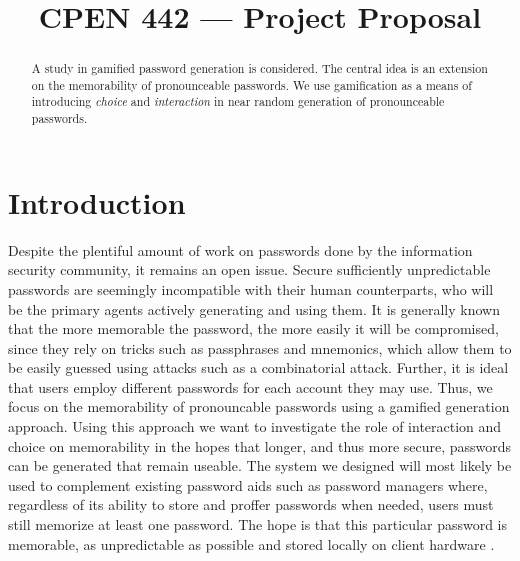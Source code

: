 \documentclass[conference]{IEEEtran}
\begin{document}
\title{CPEN 442 --- Project Proposal}


\author{
\and
{}
}


\maketitle

\begin{abstract}
A study in gamified password generation is considered. The central idea is an extension on the memorability of pronounceable passwords. We use gamification as a means of introducing \emph{choice} and \emph{interaction} in near random generation of pronounceable passwords.
\end{abstract}

\section{Introduction}
Despite the plentiful amount of work on passwords done by the information security community, it remains an open issue. Secure sufficiently unpredictable passwords are seemingly incompatible with their human counterparts, who will be the primary agents actively generating and using them. It is generally known that the more memorable the password, the more easily it will be compromised, since they rely on tricks such as passphrases and mnemonics, which allow them to be easily guessed using attacks such as a combinatorial attack. Further, it is ideal that users employ different passwords for each account they may use. Thus, we focus on the memorability of pronouncable passwords using a gamified generation approach. Using this approach we want to investigate the role of interaction and choice on memorability in the hopes that longer, and thus more secure, passwords can be generated that remain useable. The system we designed will most likely be used to complement existing password aids such as password managers where, regardless of its ability to store and proffer passwords when needed, users must still memorize at least one password. The hope is that this particular password is memorable, as unpredictable as possible and stored locally on client hardware
.
\end{document}
